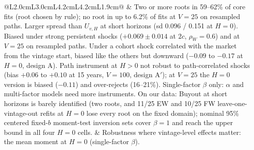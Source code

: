 \documentclass[11pt]{article}
\begin{document}
{\begin{longtable}{@{}L{2.0cm}L{3.0cm}L{4.2cm}L{4.2cm}L{1.9cm}@{}}
& Two or more roots in 59--62\% of core fits (root chosen by rule); no root in up to 6.2\% of fits at $V=25$ on resampled paths. Larger spread than $U_{v,H}$ at short horizons (sd 0.096 / 0.151 at $H=0$). Biased under strong persistent shocks ($+0.069\pm0.014$ at $2c$, $\rho_W=0.6$) and at $V=25$ on resampled paths. Under a cohort shock correlated with the market from the vintage start, biased like the others but downward ($-0.09$ to $-0.17$ at $H=0$, design A). Path instrument at $H>0$ not robust to path-correlated shocks (bias $+0.06$ to $+0.10$ at 15 years, $V=100$, design A$'$); at $V=25$ the $H=0$ version is biased ($-0.11$) and over-rejects (16--21\%). Single-factor $\beta$ only: $\alpha$ and multi-factor models need more instruments. On our data: Buyout at short horizons is barely identified (two roots, and 11/25 EW and 10/25 FW leave-one-vintage-out refits at $H=0$ lose every root on the fixed domain); nominal 95\% centered fixed-$b$ moment-test inversion sets cover $\beta=1$ and reach the upper bound in all four $H=0$ cells.
& Robustness where vintage-level effects matter: the mean moment at $H=0$ (single-factor $\beta$).\\
\bottomrule
\end{longtable}
}
\end{document}
